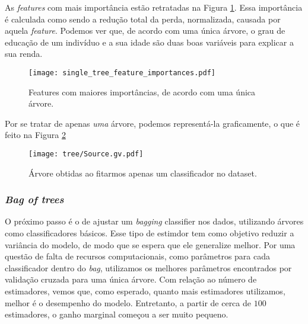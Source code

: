 As \emph{features} com mais importância estão retratadas na Figura \ref{single tree feature}.
Essa importância é calculada como sendo a redução total da perda, normalizada, causada por aquela \emph{feature}.
Podemos ver que, de acordo com uma única árvore, o grau de educação de um indivíduo e a sua idade são duas boas variáveis para explicar a sua renda.
\begin{figure}[htb]
    \begin{center}
        \texttt{[image: single\_tree\_feature\_importances.pdf]}
    \end{center}
    \caption{Features com maiores importâncias, de acordo com uma única árvore.}
    \label{single tree feature}
\end{figure}
Por se tratar de apenas \emph{uma} árvore, podemos representá-la graficamente, o que é feito na Figura \ref{plot tree}
\begin{figure}[htb]
    \begin{center}
        \texttt{[image: tree/Source.gv.pdf]}
    \end{center}
    \caption{Árvore obtidas ao fitarmos apenas um classificador no dataset.}
    \label{plot tree}
\end{figure}

\subsubsection{\emph{Bag of trees}}

O próximo passo é o de ajustar um \emph{bagging} classifier nos dados, utilizando árvores como classificadores básicos.
Esse tipo de estimdor tem como objetivo reduzir a variância do modelo, de modo que se espera que ele generalize melhor.
Por uma questão de falta de recursos computacionais, como parâmetros para cada classificador dentro do \emph{bag}, utilizamos os melhores parâmetros encontrados por validação cruzada para uma única árvore.
Com relação ao número de estimadores, vemos que, como esperado, quanto mais estimadores utilizamos, melhor é o desempenho do modelo.
Entretanto, a partir de cerca de \( 100 \) estimadores, o ganho marginal começou a ser muito pequeno.

